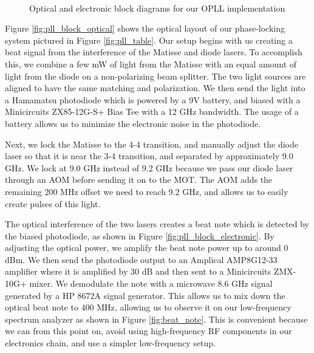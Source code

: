   

\begin{figure}[!ht]
  \centering
   \\
  \caption[OPLL block diagrams]{Optical and electronic block diagrams for our OPLL implementation }
  \label{fig:opll_block}
\end{figure}

Figure \ref{fig:pll_block_optical} shows the optical layout of our
phase-locking system pictured in Figure \ref{fig:pll_table}.  Our setup begins
with us creating a beat signal from the interference of the Matisse and diode
lasers.  To accomplish this, we combine a few mW of light from the Matisse
with an equal amount of light from the diode on a non-polarizing beam splitter. The two light sources are aligned to have the same matching and polarization.  We then send the light into a Hamamatsu photodiode which is powered by a 9V battery, and biased with a Minicircuits ZX85-12G-S+ Bias Tee with a 12 GHz bandwidth.  The usage of a battery allows us to minimize the electronic noise in the photodiode.

Next, we lock the Matisse to the 4-4 transition, and manually adjust the diode
laser so that it is near the 3-4 transition, and separated by approximately
9.0 GHz.  We lock at 9.0 GHz instead of 9.2 GHz because we pass our diode
laser through an AOM before sending it on to the MOT.  The AOM adds the
remaining 200 MHz offset we need to reach 9.2 GHz, and allows us to easily
create pulses of this light.  

The optical interference of the two lasers
creates a beat note which is detected by the biased photodiode, as shown in
Figure \ref{fig:pll_block_electronic}.  By adjusting the
optical power, we amplify the beat note power up to around 0 dBm.  We then send the photodiode output to an Amplical AMP8G12-33 amplifier where
it is amplified by 30 dB and then sent to a Minicircuits ZMX-10G+ mixer.  We
demodulate the note with a microwave 8.6 GHz signal generated by a HP 8672A signal generator.  This allows us to mix down the optical beat note to 400 MHz, allowing us to observe it on our low-frequency spectrum analyzer as shown in Figure \ref{fig:beat_note}.  This is convenient because we can from this point on, avoid using high-frequency RF components in our electronics chain, and use a simpler low-frequency setup.  

